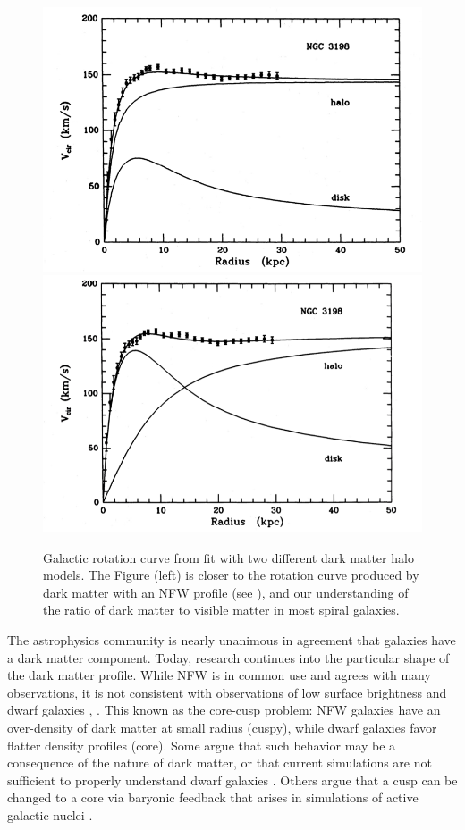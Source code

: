 \begin{figure}[htbp]
\begin{center}
\includegraphics[width=\halffig]{figures/theory/rot_curve2.png}
\includegraphics[width=\halffig]{figures/theory/rot_curve1.png}
\caption{Galactic rotation curve from \cite{Albada1985} fit with two different dark matter halo models. The Figure (left) is closer to the rotation curve produced by dark matter with an \acs{NFW} profile (see \cite{Navarro1996}), and our understanding of the ratio of dark matter to visible matter in most spiral galaxies. }
\label{fig:rot_curve}
\end{center}
\end{figure}

The astrophysics community is nearly unanimous in agreement that galaxies have a dark matter component. Today, research continues into the particular shape of the dark matter profile. While \ac{NFW} is in common use and agrees with many observations, it is not consistent with observations of low surface brightness and dwarf galaxies \cite{DeBlok2001}, \cite{DeBlok2001a}. This known as the core-cusp problem: \ac{NFW} galaxies have an over-density of dark matter at small radius (cuspy), while dwarf galaxies favor flatter density profiles (core). Some argue that such behavior may be a consequence of the nature of dark matter, or that current simulations are not sufficient to properly understand dwarf galaxies \cite{Oman2015}. Others argue that a cusp can be changed to a core via baryonic feedback that arises in simulations of active galactic nuclei \cite{Martizzi2013}. 

